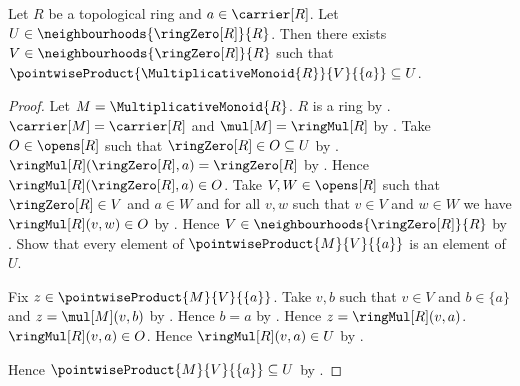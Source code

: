 \begin{lemma}\label{topological_ring_right_multiplication_zero_neighbourhood}
    Let $R$ be a topological ring and $a\in\carrier[R]$.
    Let $U\in\neighbourhoods{\ringZero[R]}{R}$.
    Then there exists $V\in\neighbourhoods{\ringZero[R]}{R}$ such that
        $\pointwiseProduct{\MultiplicativeMonoid{R}}{V}{\{a\}}\subseteq U$.
\end{lemma}
\begin{proof}
    Let $M=\MultiplicativeMonoid{R}$.
    $R$ is a ring by .
    $\carrier[M]=\carrier[R]$ and $\mul[M]=\ringMul[R]$ by
        .
    Take $O\in\opens[R]$ such that
        $\ringZero[R]\in O\subseteq U$ by .
    $\ringMul[R](\ringZero[R],a)=\ringZero[R]$ by
        .
    Hence $\ringMul[R](\ringZero[R],a)\in O$.
    Take $V,W\in\opens[R]$ such that
        $\ringZero[R]\in V$ and $a\in W$ and
        for all $v,w$ such that $v\in V$ and $w\in W$ we have
            $\ringMul[R](v,w)\in O$ by
        .
    Hence $V\in\neighbourhoods{\ringZero[R]}{R}$ by
        .
    Show that every element of $\pointwiseProduct{M}{V}{\{a\}}$ is an
        element of $U$.
    \begin{subproof}
        Fix $z\in\pointwiseProduct{M}{V}{\{a\}}$.
        Take $v,b$ such that $v\in V$ and $b\in\{a\}$ and
            $z=\mul[M](v,b)$ by .
        Hence $b=a$ by .
        Hence $z=\ringMul[R](v,a)$.
        $\ringMul[R](v,a)\in O$.
        Hence $\ringMul[R](v,a)\in U$ by .
    \end{subproof}
    Hence $\pointwiseProduct{M}{V}{\{a\}}\subseteq U$ by .
\end{proof}

